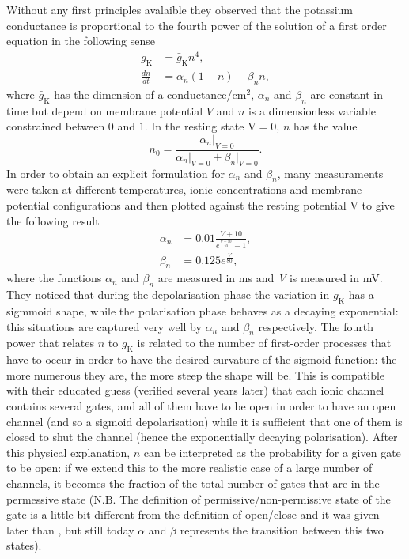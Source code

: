 \documentclass[a4paper,11pt ]{report}
\theoremstyle{definition}
\begin{document}
Without any first principles avalaible they observed that the potassium conductance is proportional to the fourth power of the solution of a first order equation in the following sense
\begin{align}\label{gate_n}
g_\text{K}&=\bar{g}_\text{K}n^4,\nonumber\\
\frac{dn}{dt}&=\alpha_n(1-n)-\beta_nn,
\end{align}
where $\bar{g}_\text{K}$ has the dimension of a conductance/$\text{cm}^2$, $\alpha_n$ and $\beta_n$ are constant in time but depend on membrane potential $V$ and $n$ is a dimensionless variable constrained between $0$ and $1$. In the resting state $\text{V}=0$, $n$ has the value
\begin{equation*}
n_0=\frac{\alpha_n\vert_{V=0}}{\alpha_n\vert_{V=0}+\beta_n\vert_{V=0}}.
\end{equation*}
In order to obtain an explicit formulation for $\alpha_n$ and $\beta_n$, many measuraments were taken at different temperatures, ionic concentrations and membrane potential configurations and then plotted against the resting potential $\text{V}$ to give the following result
\begin{align*}
\alpha_n&=0.01\frac{\textit{V}+10}{e^{\frac{\textit{V}+10}{10}}-1},\\
\beta_n&=0.125e^{\frac{\textit{V}}{80}},
\end{align*}
where the functions $\alpha_n$ and $\beta_n$ are measured in ms and \textit{V} is measured in mV. They noticed that during the depolarisation phase the variation in $g_\text{K}$ has a sigmmoid shape, while the polarisation phase behaves as a decaying exponential: this situations are captured very well by $\alpha_n$ and $\beta_n$ respectively. The fourth power that relates $n$ to $g_{\text{K}}$ is related to the number of first-order processes that have to occur in order to have the desired curvature of the sigmoid function: the more numerous they are, the more steep the shape will be. This is compatible with their educated guess (verified several years later) that each ionic channel contains several gates, and all of them have to be open in order to have an open channel (and so a sigmoid depolarisation) while it is sufficient that one of them is closed to shut the channel (hence the exponentially decaying polarisation). After this physical explanation, $n$ can be interpreted as the probability for a given gate to be open: if we extend this to the more realistic case of a large number of channels, it becomes the fraction of the total number of gates that are in the permessive state (N.B. The definition of permissive/non-permissive state of the gate is a little bit different from the definition of open/close and it was given later than \cite{main_paper_HH}, but still today $\alpha$ and $\beta$ represents the transition between this two states).\\
\end{document}
